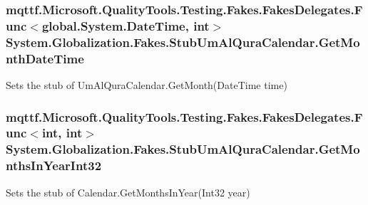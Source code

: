 \hypertarget{class_system_1_1_globalization_1_1_fakes_1_1_stub_um_al_qura_calendar_ac9321cc2dec83b5d0466999cde6ff002}{
\subsubsection[{Get\-Month\-Date\-Time}]{\setlength{\rightskip}{0pt plus 5cm}mqttf.\-Microsoft.\-Quality\-Tools.\-Testing.\-Fakes.\-Fakes\-Delegates.\-Func$<$global.\-System.\-Date\-Time, int$>$ System.\-Globalization.\-Fakes.\-Stub\-Um\-Al\-Qura\-Calendar.\-Get\-Month\-Date\-Time}}\label{class_system_1_1_globalization_1_1_fakes_1_1_stub_um_al_qura_calendar_ac9321cc2dec83b5d0466999cde6ff002}


Sets the stub of Um\-Al\-Qura\-Calendar.\-Get\-Month(\-Date\-Time time)

\hypertarget{class_system_1_1_globalization_1_1_fakes_1_1_stub_um_al_qura_calendar_a539c9a0ba0950141e83b11a12625633c}{
\subsubsection[{Get\-Months\-In\-Year\-Int32}]{\setlength{\rightskip}{0pt plus 5cm}mqttf.\-Microsoft.\-Quality\-Tools.\-Testing.\-Fakes.\-Fakes\-Delegates.\-Func$<$int, int$>$ System.\-Globalization.\-Fakes.\-Stub\-Um\-Al\-Qura\-Calendar.\-Get\-Months\-In\-Year\-Int32}}\label{class_system_1_1_globalization_1_1_fakes_1_1_stub_um_al_qura_calendar_a539c9a0ba0950141e83b11a12625633c}


Sets the stub of Calendar.\-Get\-Months\-In\-Year(\-Int32 year)

